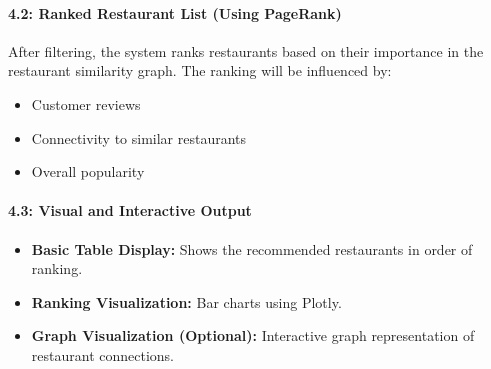 \documentclass[fontsize=11pt]{article}
\begin{document}
\paragraph*{4.2: Ranked Restaurant List (Using PageRank)}
After filtering, the system ranks restaurants based on their importance in the restaurant similarity graph. The ranking will be influenced by:
\begin{itemize}
    \item Customer reviews
    \item Connectivity to similar restaurants
    \item Overall popularity
\end{itemize}

\paragraph*{4.3: Visual and Interactive Output}
\begin{itemize}
    \item \textbf{Basic Table Display:} Shows the recommended restaurants in order of ranking.
    \item \textbf{Ranking Visualization:} Bar charts using Plotly.
    \item \textbf{Graph Visualization (Optional):} Interactive graph representation of restaurant connections.
\end{itemize}
\end{document}
